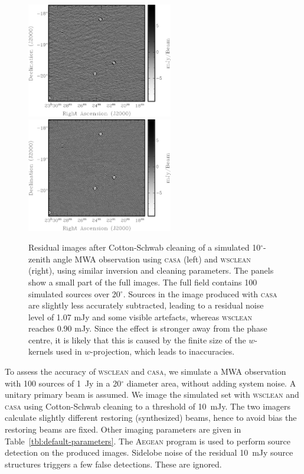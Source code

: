 \documentclass[useAMS,usenatbib]{mn2e}
\newcommand{\degree}{\ensuremath{^{\circ}}\xspace}
\begin{document}
\begin{figure}
\begin{center}
\includegraphics[height=5cm]{img/residual-casa-fixed-grayscale}\hspace{1cm}\includegraphics[height=5cm]{img/residual-wsclean}
\caption{Residual images after Cotton-Schwab cleaning of a simulated 10\degree-zenith angle MWA observation using \textsc{casa} (left) and \textsc{wsclean} (right), using similar inversion and cleaning parameters. The panels show a small part of the full images. The full field contains 100 simulated sources over 20\degree. Sources in the image produced with \textsc{casa} are slightly less accurately subtracted, leading to a residual noise level of 1.07 mJy and some visible artefacts, whereas \textsc{wsclean} reaches 0.90 mJy. Since the effect is stronger away from the phase centre, it is likely that this is caused by the finite size of the $w$-kernels used in $w$-projection, which leads to inaccuracies.}
\label{fig:residuals}
\end{center}
\end{figure}

To assess the accuracy of \textsc{wsclean} and \textsc{casa}, we simulate a MWA observation with 100 sources of 1~Jy in a 20\degree diameter area, without adding system noise. A unitary primary beam is assumed. We image the simulated set with \textsc{wsclean} and \textsc{casa} using Cotton-Schwab cleaning to a threshold of 10~mJy. The two imagers calculate slightly different restoring (synthesized) beams, hence to avoid bias the restoring beams are fixed. Other imaging parameters are given in Table~\ref{tbl:default-parameters}. The \textsc{Aegean} program \citep{aegean-hancock-2012} is used to perform source detection on the produced images. Sidelobe noise of the residual 10~mJy source structures triggers a few false detections. These are ignored.
\end{document}
